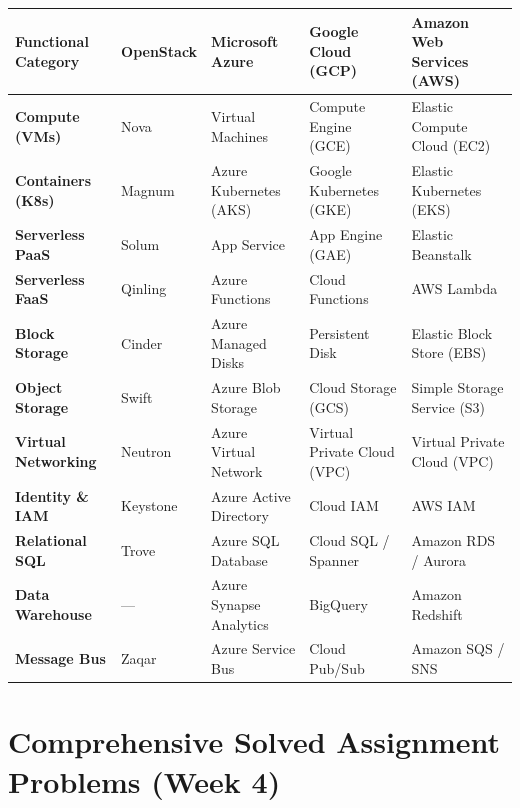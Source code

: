 \documentclass[11pt,a4paper,openany]{report}
\begin{document}
\begin{center}
\begin{tabularx}{\textwidth}{>{\bfseries}l l l l l}
\toprule
Functional Category & OpenStack & Microsoft Azure & Google Cloud (GCP) & Amazon Web Services (AWS)\\
\midrule
Compute (VMs) & Nova & Virtual Machines & Compute Engine (GCE) & Elastic Compute Cloud (EC2)\\
Containers (K8s) & Magnum & Azure Kubernetes (AKS) & Google Kubernetes (GKE) & Elastic Kubernetes (EKS)\\
Serverless PaaS & Solum & App Service & App Engine (GAE) & Elastic Beanstalk\\
Serverless FaaS & Qinling & Azure Functions & Cloud Functions & AWS Lambda\\
Block Storage & Cinder & Azure Managed Disks & Persistent Disk & Elastic Block Store (EBS)\\
Object Storage & Swift & Azure Blob Storage & Cloud Storage (GCS) & Simple Storage Service (S3)\\
Virtual Networking & Neutron & Azure Virtual Network & Virtual Private Cloud (VPC) & Virtual Private Cloud (VPC)\\
Identity \& IAM & Keystone & Azure Active Directory & Cloud IAM & AWS IAM\\
Relational SQL & Trove & Azure SQL Database & Cloud SQL / Spanner & Amazon RDS / Aurora\\
Data Warehouse & --- & Azure Synapse Analytics & BigQuery & Amazon Redshift\\
Message Bus & Zaqar & Azure Service Bus & Cloud Pub/Sub & Amazon SQS / SNS\\
\bottomrule
\end{tabularx}
\end{center}

\section{Comprehensive Solved Assignment Problems (Week 4)}
\end{document}
